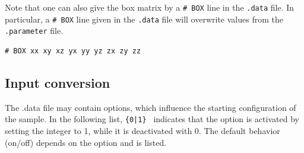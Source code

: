 Note that one can also give the box matrix by a \texttt{\# BOX} line
in the \texttt{.data} file. In particular, a \texttt{\# BOX} line
given in the \texttt{.data} file will overwrite values from the
\texttt{.parameter} file.
\begin{lstlisting}
# BOX xx xy xz yx yy yz zx zy zz
\end{lstlisting}

\subsection{Input conversion}
\label{INPUTCONV}
The .data file may contain options, which influence the starting configuration of the sample. In the following list, {\tt \{0|1\} } indicates that the option is activated by setting the integer to 1, while it is deactivated with 0. The default behavior (on/off) depends on the option and is listed.
